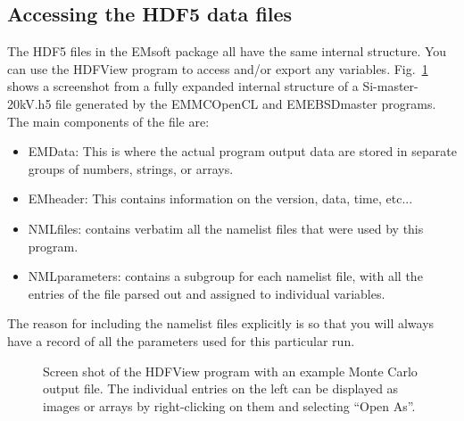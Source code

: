 \documentclass[DIV=calc, paper=letter, fontsize=11pt]{scrartcl}	 %
\begin{document}
\subsection{Accessing the HDF5 data files}
The HDF5 files in the EMsoft package all have the same internal structure.  You can use the HDFView program to
access and/or export any variables.  Fig.~\ref{fig:hdf} shows a screenshot from a fully expanded internal structure of a Si-master-20kV.h5
file generated by the \textsf{EMMCOpenCL} and \textsf{EMEBSDmaster} programs.  The main components of the file are: 
\begin{itemize}
	\item EMData: This is where the actual program output data are stored in separate groups of numbers, strings, or arrays.
	\item EMheader: This contains information on the version, data, time, etc...
	\item NMLfiles: contains verbatim all the namelist files that were used by this program.
	\item NMLparameters: contains a subgroup for each namelist file, with all the entries of the file parsed out and 
	assigned to individual variables.
\end{itemize}
The reason for including the namelist files explicitly is so that you will always have a record of all the parameters used 
for this particular run.

\begin{figure}[h]
\leavevmode\centering
\epsfxsize=3.0in
\caption{\label{fig:hdf}Screen shot of the HDFView program with an example Monte Carlo output file.  The individual entries
on the left can be displayed as images or arrays by right-clicking on them and selecting ``Open As''.}
\end{figure}
\end{document}
